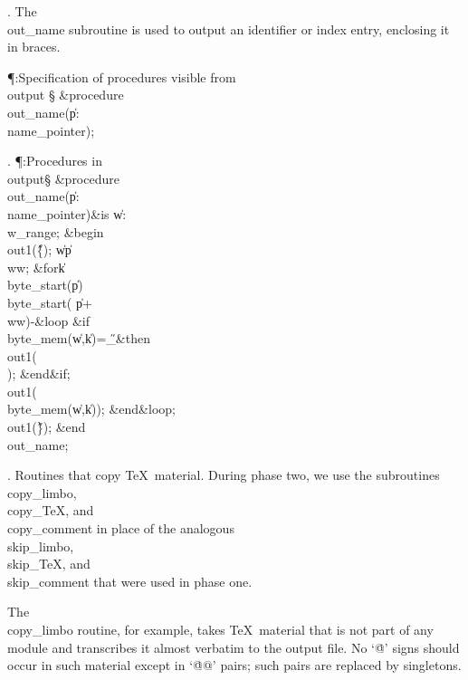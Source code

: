. The \\{out\_name} subroutine is used to output an identifier or index
entry, enclosing it in braces.

\Y\P\?\4:Specification of procedures visible from \\{output}\X\mathrel{+}%
\S\?\6
\&{procedure}\8\1\\{out\_name}\?(\1\?\|p\?:\?\\{name\_pointer}\?\2)\?\2;\par
\fi

. \P\?:Procedures in \\{output}\X\mathrel{+}\S\?\6
\&{procedure}\8\1\\{out\_name}\?(\1\?\|p\?:\?\\{name\_pointer}\?\2)\?\2\8\&{is}%
\8\1\6
\|w\?:\?\\{w\_range};\6
\4\&{begin}\6
\\{out1}\?\1(\?\H{\{}\?\2)\?;\5
\|w\?\K\?\|p\?\?\\{ww};\6
\1\&{for}\8\|k\?\in\?\\{byte\_start}\?\1(\?\|p\?\2)\to\?\\{byte\_start}\?\1(\?%
\|p\?+\?\\{ww}\?\2)-\8\&{loop}\6
\&{if}\1\1\8\\{byte\_mem}\?\1(\?\|w\?,\?\|k\?\2)=\?\H{\_}\2\8\&{then}\6
\\{out1}\?\1(\?\H{\\}\?\2)\?;\2\6
\&{end}\8\2\&{if}\1;\6
\\{out1}\?\1(\?\\{byte\_mem}\?\1(\?\|w\?,\?\|k\?\2)\2)\?;\2\6
\&{end}\8\&{loop};\6
\\{out1}\?\1(\?\H{\}}\?\2)\?;\2\6
\&{end}\8\\{out\_name};\par
\fi

.  Routines that copy \TeX\ material.
During phase two, we use the subroutines \\{copy\_limbo}, \\{copy\_TeX}, and
\\{copy\_comment} in place of the analogous \\{skip\_limbo}, \\{skip\_TeX}, and
\\{skip\_comment} that were used in phase one.

The \\{copy\_limbo} routine, for example, takes \TeX\ material that is not
part of any module and transcribes it almost verbatim to the output file.
No `\.{@}' signs should occur in such material except in `\.{@@}'
pairs; such pairs are replaced by singletons.

